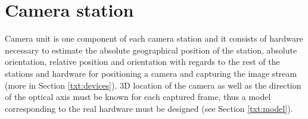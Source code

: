 %
%	
%
%


\section{Camera station}

Camera unit is one component of each camera station and it consists of hardware necessary to estimate the absolute geographical position of the station, absolute orientation, relative position and orientation with regards to the rest of the stations and hardware for positioning a camera and capturing the image stream (more in Section \ref{txt:devices}). 3D location of the camera as well as the direction of the optical axis must be known for each captured frame, thus a model corresponding to the real hardware must be designed (see Section \ref{txt:model}).

